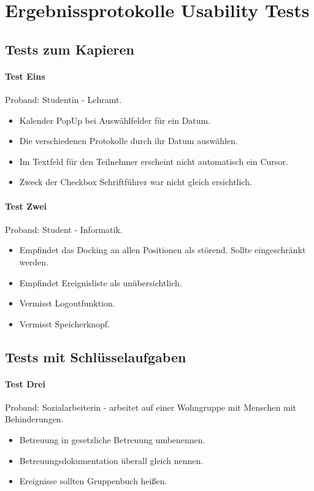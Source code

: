 \section{Ergebnissprotokolle Usability Tests}
\subsection{Tests zum Kapieren}
\paragraph*{Test Eins}
Proband: Studentin - Lehramt. 
\begin{itemize}
	\item Kalender PopUp bei Auswählfelder für ein Datum.
	\item Die verschiedenen Protokolle durch ihr Datum auswählen.
	\item Im Textfeld für den Teilnehmer erscheint nicht automatisch ein Cursor.
	\item Zweck der Checkbox Schriftführer war nicht gleich ersichtlich.

\end{itemize}

\paragraph*{Test Zwei}
Proband: Student - Informatik. 
\begin{itemize}
	\item Empfindet das Docking an allen Positionen als störend. Sollte eingeschränkt werden.
	\item Empfindet Ereignisliste als unübersichtlich.
	\item Vermisst Logoutfunktion.
	\item Vermisst Speicherknopf.
\end{itemize}

\subsection{Tests mit Schlüsselaufgaben}
\paragraph*{Test Drei}
Proband: Sozialarbeiterin - arbeitet auf einer Wohngruppe mit Menschen mit Behinderungen. 
\begin{itemize}
	\item Betreuung in gesetzliche Betreuung umbenennen. 
	\item Betreuungsdokumentation überall gleich nennen.
	\item Ereignisse sollten Gruppenbuch heißen.
\end{itemize}

